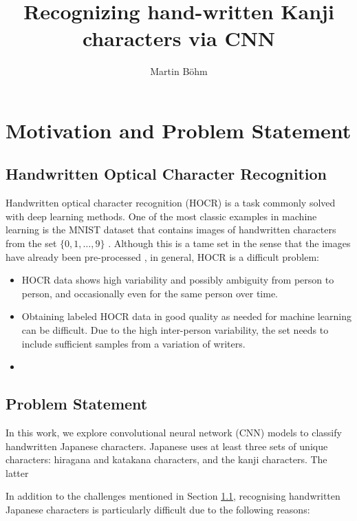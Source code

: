 \documentclass[british,12p]{article}
\title{Recognizing hand-written Kanji characters via CNN}
\author{Martin Böhm}
\begin{document}
	\maketitle
    \begin{abstract}

           

    \end{abstract}
    \tableofcontents
    \section{Motivation and Problem Statement}
    \subsection{Handwritten Optical Character Recognition}\label{secHOCR}
    Handwritten optical character recognition (HOCR) is a task commonly solved with deep learning methods. One of the most classic examples in machine learning is the MNIST dataset that contains images of handwritten characters from the set $\{0, 1, \dots, 9\}$ . Although this is a tame set in the sense that the images have already been pre-processed , in general, HOCR is a difficult problem:
    \begin{itemize}
    	\item HOCR data shows high variability and possibly ambiguity from person to person, and occasionally even for the same person over time.
    	\item Obtaining labeled HOCR data in good quality as needed for machine learning can be difficult. Due to the high inter-person variability, the set needs to include sufficient samples from a variation of writers.
    	\item 
    		
    \end{itemize}
    
    \subsection{Problem Statement}
    In this work, we explore convolutional neural network (CNN) models to classify handwritten Japanese characters. Japanese uses at least three sets of unique characters: hiragana and katakana characters, and the kanji characters. The latter 
    
    In addition to the challenges mentioned in Section \ref{secHOCR}, recognising handwritten Japanese characters is particularly difficult due to the following reasons:
    
\end{document}
